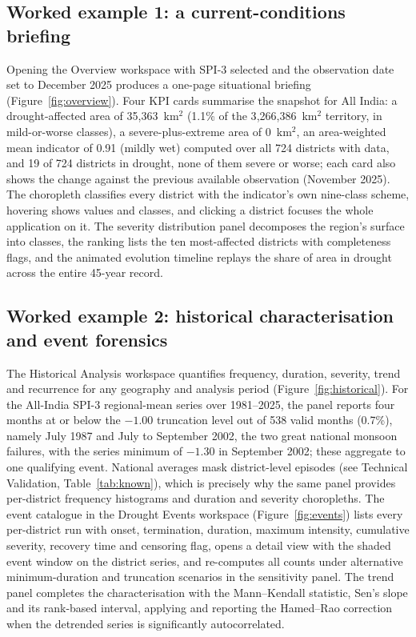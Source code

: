 \documentclass[10pt,a4paper]{article}
\begin{document}
\subsection*{Worked example 1: a current-conditions briefing}
Opening the Overview workspace with SPI-3 selected and the observation date set to December 2025 produces a one-page situational briefing (Figure~\ref{fig:overview}). Four KPI cards summarise the snapshot for All India: a drought-affected area of 35{,}363~km$^2$ (1.1\% of the 3{,}266{,}386~km$^2$ territory, in mild-or-worse classes), a severe-plus-extreme area of 0~km$^2$, an area-weighted mean indicator of 0.91 (mildly wet) computed over all 724 districts with data, and 19 of 724 districts in drought, none of them severe or worse; each card also shows the change against the previous available observation (November 2025). The choropleth classifies every district with the indicator's own nine-class scheme, hovering shows values and classes, and clicking a district focuses the whole application on it. The severity distribution panel decomposes the region's surface into classes, the ranking lists the ten most-affected districts with completeness flags, and the animated evolution timeline replays the share of area in drought across the entire 45-year record.

\subsection*{Worked example 2: historical characterisation and event forensics}
The Historical Analysis workspace quantifies frequency, duration, severity, trend and recurrence for any geography and analysis period (Figure~\ref{fig:historical}). For the All-India SPI-3 regional-mean series over 1981--2025, the panel reports four months at or below the $-1.00$ truncation level out of 538 valid months (0.7\%), namely July 1987 and July to September 2002, the two great national monsoon failures, with the series minimum of $-1.30$ in September 2002; these aggregate to one qualifying event. National averages mask district-level episodes (see Technical Validation, Table~\ref{tab:known}), which is precisely why the same panel provides per-district frequency histograms and duration and severity choropleths. The event catalogue in the Drought Events workspace (Figure~\ref{fig:events}) lists every per-district run with onset, termination, duration, maximum intensity, cumulative severity, recovery time and censoring flag, opens a detail view with the shaded event window on the district series, and re-computes all counts under alternative minimum-duration and truncation scenarios in the sensitivity panel. The trend panel completes the characterisation with the Mann--Kendall statistic, Sen's slope and its rank-based interval, applying and reporting the Hamed--Rao correction when the detrended series is significantly autocorrelated.
\end{document}
